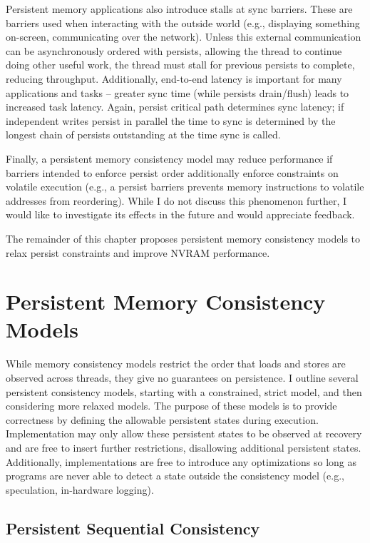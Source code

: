 Persistent memory applications also introduce stalls at sync barriers.
These are barriers used when interacting with the outside world (e.g., displaying something on-screen, communicating over the network).
Unless this external communication can be asynchronously ordered with persists, allowing the thread to continue doing other useful work, the thread must stall for previous persists to complete, reducing throughput.
Additionally, end-to-end latency is important for many applications and tasks -- greater sync time (while persists drain/flush) leads to increased task latency.
Again, persist critical path determines sync latency; if independent writes persist in parallel the time to sync is determined by the longest chain of persists outstanding at the time sync is called.

Finally, a persistent memory consistency model may reduce performance if barriers intended to enforce persist order additionally enforce constraints on volatile execution (e.g., a persist barriers prevents memory instructions to volatile addresses from reordering).
While I do not discuss this phenomenon further, I would like to investigate its effects in the future and would appreciate feedback.

The remainder of this chapter proposes persistent memory consistency models to relax persist constraints and improve NVRAM performance.

\section{Persistent Memory Consistency Models}
\label{sec:PMC:PersistenceModels}

While memory consistency models restrict the order that loads and stores are observed across threads, they give no guarantees on persistence.
I outline several persistent consistency models, starting with a constrained, strict model, and then considering more relaxed models.
The purpose of these models is to provide correctness by defining the allowable persistent states during execution.
Implementation may only allow these persistent states to be observed at recovery and are free to insert further restrictions, disallowing additional persistent states.
Additionally, implementations are free to introduce any optimizations so long as programs are never able to detect a state outside the consistency model (e.g., speculation, in-hardware logging).

\subsection{Persistent Sequential Consistency}
\label{sec:PMC:PersistenceModels:PSC}

